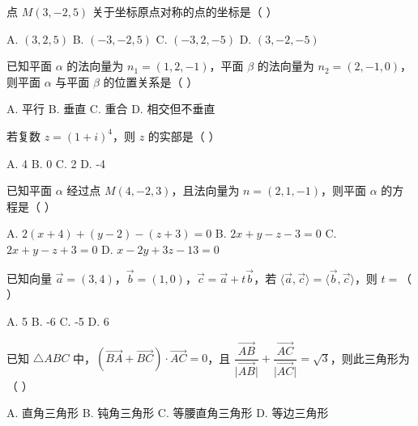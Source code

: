 \documentclass[11pt, a4paper]{article}
\begin{document}
\begin{baitap}[21]
点 $M(3, -2, 5)$ 关于坐标原点对称的点的坐标是（ ）
\par\vspace{3pt}
\noindent A. $(3, 2, 5)$ \quad B. $(-3, -2, 5)$ \quad C. $(-3, 2, -5)$ \quad D. $(3, -2, -5)$
\end{baitap}

\begin{baitap}[22]
已知平面 $\alpha$ 的法向量为 $n_1 = (1, 2, -1)$，平面 $\beta$ 的法向量为 $n_2 = (2, -1, 0)$，则平面 $\alpha$ 与平面 $\beta$ 的位置关系是（ ）
\par\vspace{3pt}
\noindent A. 平行 \quad B. 垂直 \quad C. 重合 \quad D. 相交但不垂直
\end{baitap}

\begin{baitap}[23]
若复数 $z = (1 + i)^4$，则 $z$ 的实部是（ ）
\par\vspace{3pt}
\noindent A. 4 \quad B. 0 \quad C. 2 \quad D. -4
\end{baitap}

\begin{baitap}[24]
已知平面 $\alpha$ 经过点 $M(4, -2, 3)$，且法向量为 $n = (2, 1, -1)$，则平面 $\alpha$ 的方程是（ ）
\par\vspace{3pt}
\noindent A. $2(x + 4) + (y - 2) - (z + 3) = 0$ \quad B. $2x + y - z - 3 = 0$ \quad C. $2x + y - z + 3 = 0$ \quad D. $x - 2y + 3z - 13 = 0$
\end{baitap}

\begin{baitap}[25]
已知向量 $\vec{a} = (3, 4)$，$\vec{b} = (1, 0)$，$\vec{c} = \vec{a} + t\vec{b}$，若 $\langle \vec{a}, \vec{c} \rangle = \langle \vec{b}, \vec{c} \rangle$，则 $t =$（ ）
\par\vspace{3pt}
\noindent A. 5 \quad B. -6 \quad C. -5 \quad D. 6
\end{baitap}

\begin{baitap}[26]
已知 $\triangle ABC$ 中，$(\overrightarrow{BA} + \overrightarrow{BC}) \cdot \overrightarrow{AC} = 0$，且 $\dfrac{\overrightarrow{AB}}{\lvert \overrightarrow{AB} \rvert} + \dfrac{\overrightarrow{AC}}{\lvert \overrightarrow{AC} \rvert} = \sqrt{3}$，则此三角形为（ ）
\par\vspace{3pt}
\noindent A. 直角三角形 \quad B. 钝角三角形 \quad C. 等腰直角三角形 \quad D. 等边三角形
\end{baitap}
\end{document}
